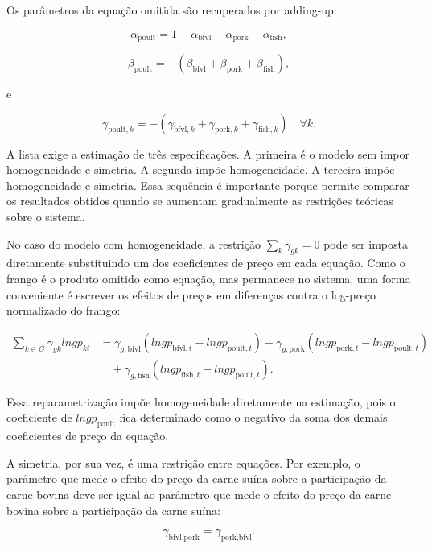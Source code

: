\documentclass[12pt,a4paper]{article}
\begin{document}
Os parâmetros da equação omitida são recuperados por adding-up:

\[
\alpha_{\text{poult}}
=
1
-
\alpha_{\text{bfvl}}
-
\alpha_{\text{pork}}
-
\alpha_{\text{fish}},
\tag{13}
\label{eq:alpha_omitida}
\]

\[
\beta_{\text{poult}}
=
-
\left(
\beta_{\text{bfvl}}
+
\beta_{\text{pork}}
+
\beta_{\text{fish}}
\right),
\tag{14}
\label{eq:beta_omitida}
\]

e

\[
\gamma_{\text{poult},k}
=
-
\left(
\gamma_{\text{bfvl},k}
+
\gamma_{\text{pork},k}
+
\gamma_{\text{fish},k}
\right)
\quad
\forall k.
\tag{15}
\label{eq:gamma_omitida}
\]

A lista exige a estimação de três especificações. A primeira é o modelo sem impor homogeneidade e simetria. A segunda impõe homogeneidade. A terceira impõe homogeneidade e simetria. Essa sequência é importante porque permite comparar os resultados obtidos quando se aumentam gradualmente as restrições teóricas sobre o sistema.

No caso do modelo com homogeneidade, a restrição \(\sum_{k}\gamma_{gk}=0\) pode ser imposta diretamente substituindo um dos coeficientes de preço em cada equação. Como o frango é o produto omitido como equação, mas permanece no sistema, uma forma conveniente é escrever os efeitos de preços em diferenças contra o log-preço normalizado do frango:

\[
\begin{aligned}
\sum_{k \in G}\gamma_{gk}lngp_{kt}
&=
\gamma_{g,\text{bfvl}}
\left(
lngp_{\text{bfvl},t}
-
lngp_{\text{poult},t}
\right)
+
\gamma_{g,\text{pork}}
\left(
lngp_{\text{pork},t}
-
lngp_{\text{poult},t}
\right)
\\
&\quad+
\gamma_{g,\text{fish}}
\left(
lngp_{\text{fish},t}
-
lngp_{\text{poult},t}
\right).
\end{aligned}
\tag{16}
\label{eq:homog_substituicao}
\]

Essa reparametrização impõe homogeneidade diretamente na estimação, pois o coeficiente de \(lngp_{\text{poult}}\) fica determinado como o negativo da soma dos demais coeficientes de preço da equação.

A simetria, por sua vez, é uma restrição entre equações. Por exemplo, o parâmetro que mede o efeito do preço da carne suína sobre a participação da carne bovina deve ser igual ao parâmetro que mede o efeito do preço da carne bovina sobre a participação da carne suína:

\[
\gamma_{\text{bfvl},\text{pork}}
=
\gamma_{\text{pork},\text{bfvl}}.
\tag{17}
\label{eq:simetria_exemplo}
\]
\end{document}
